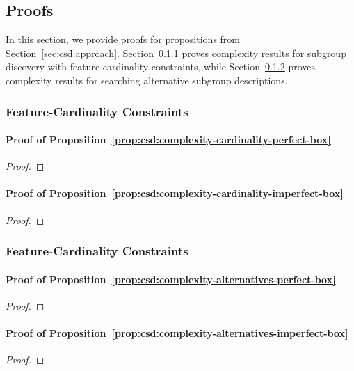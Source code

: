 \documentclass{article}
\theoremstyle{definition}
\begin{document}
\cite{li2021maxsat} \cite{bacchus2021maximum}

\subsection{Proofs}
\label{sec:csd:appendix:proofs}

In this section, we provide proofs for propositions from Section~\ref{sec:csd:approach}.
Section~\ref{sec:csd:appendix:proofs:cardinality} proves complexity results for subgroup discovery with feature-cardinality constraints, while Section~\ref{sec:csd:appendix:proofs:alternatives} proves complexity results for searching alternative subgroup descriptions.

\subsubsection{Feature-Cardinality Constraints}
\label{sec:csd:appendix:proofs:cardinality}

\paragraph{Proof of Proposition~\ref{prop:csd:complexity-cardinality-perfect-box}}
%
\begin{proof}
\end{proof}

\paragraph{Proof of Proposition~\ref{prop:csd:complexity-cardinality-imperfect-box}}
%
\begin{proof}
\end{proof}

\subsubsection{Feature-Cardinality Constraints}
\label{sec:csd:appendix:proofs:alternatives}

\paragraph{Proof of Proposition~\ref{prop:csd:complexity-alternatives-perfect-box}}
%
\begin{proof}
\end{proof}

\paragraph{Proof of Proposition~\ref{prop:csd:complexity-alternatives-imperfect-box}}
%
\begin{proof}
\end{proof}

\renewcommand*{\bibfont}{\small} %
\printbibliography
\end{document}

